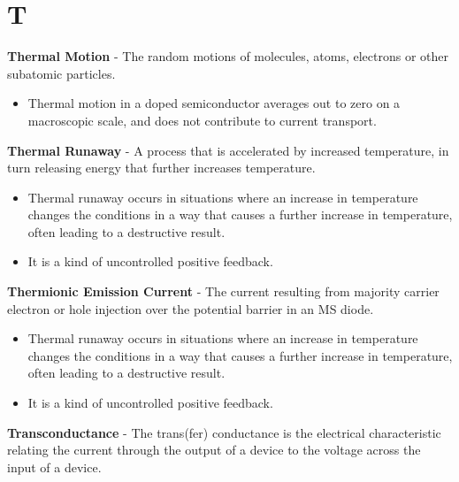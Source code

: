 \section{T}
    \textbf{Thermal Motion} - The random motions of molecules, atoms, electrons or other subatomic particles.
    \vspace{0.15cm}
    \begin{itemize}
        \setlength\itemsep{0.5em}
        \item{Thermal motion in a doped semiconductor averages out to zero on a macroscopic scale, and does not contribute to current transport.}
    \end{itemize}
\vspace{0.5cm}
    \textbf{Thermal Runaway} - A process that is accelerated by increased temperature, in turn releasing energy that further increases temperature.
    \vspace{0.15cm}
    \begin{itemize}
        \setlength\itemsep{0.5em}
        \item{Thermal runaway occurs in situations where an increase in temperature changes the conditions in a way that causes a further increase in temperature, often leading to a destructive result.}
        \item{It is a kind of uncontrolled positive feedback.}
    \end{itemize}
\vspace{0.5cm}
    \textbf{Thermionic Emission Current} - The current resulting from majority carrier electron or hole injection over the potential barrier in an MS diode.
    \vspace{0.15cm}
    \begin{itemize}
        \setlength\itemsep{0.5em}
        \item{Thermal runaway occurs in situations where an increase in temperature changes the conditions in a way that causes a further increase in temperature, often leading to a destructive result.}
        \item{It is a kind of uncontrolled positive feedback.}
    \end{itemize}
\vspace{0.5cm}
    \textbf{Transconductance} - The trans(fer) conductance is the electrical characteristic relating the current through the output of a device to the voltage across the input of a device.
